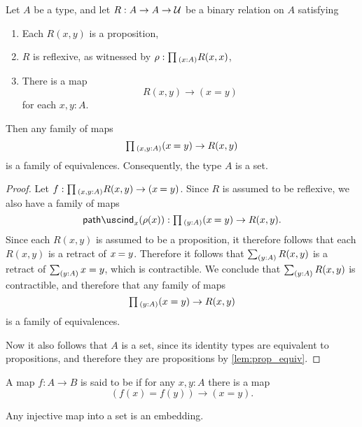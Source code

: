 \begin{thm}\label{lem:prop_to_id}
Let $A$ be a type, and let $R:A\to A\to\mathcal{U}$ be a binary relation on $A$ satisfying
\begin{enumerate}
\item Each $R(x,y)$ is a proposition,
\item $R$ is reflexive, as witnessed by $\rho:\prd{x:A}R(x,x)$,
\item There is a map
  \begin{equation*}
    R(x,y)\to (x=y)
  \end{equation*}
  for each $x,y:A$.
\end{enumerate}
Then any family of maps
\begin{equation*}
\prd{x,y:A}(\id{x}{y})\to R(x,y)
\end{equation*}
is a family of equivalences. Consequently, the type $A$ is a set.
\end{thm}

\begin{proof}
Let $f:\prd{x,y:A}R(x,y)\to(\id{x}{y})$. 
Since $R$ is assumed to be reflexive, we also have a family of maps
\begin{equation*}
\pathind_x(\rho(x)):\prd{y:A}(\id{x}{y})\to R(x,y).
\end{equation*}
Since each $R(x,y)$ is assumed to be a proposition, it therefore follows that each $R(x,y)$ is a retract of $\id{x}{y}$. Therefore it follows that $\sm{y:A}R(x,y)$ is a retract of $\sm{y:A}x=y$, which is contractible. We conclude that $\sm{y:A}R(x,y)$ is contractible, and therefore that any family of maps
\begin{equation*}
  \prd{y:A}(x=y)\to R(x,y)
\end{equation*}
is a family of equivalences.

Now it also follows that $A$ is a set, since its identity types are equivalent to propositions, and therefore they are propositions by \cref{lem:prop_equiv}. 
\end{proof}

\begin{defn}
  A map $f:A\to B$ is said to be  if for any $x,y:A$ there is a map
  \begin{equation*}
    (f(x)=f(y))\to (x=y).
  \end{equation*}
\end{defn}

\begin{cor}\label{cor:is-emb-is-injective}
  Any injective map into a set is an embedding.
\end{cor}

